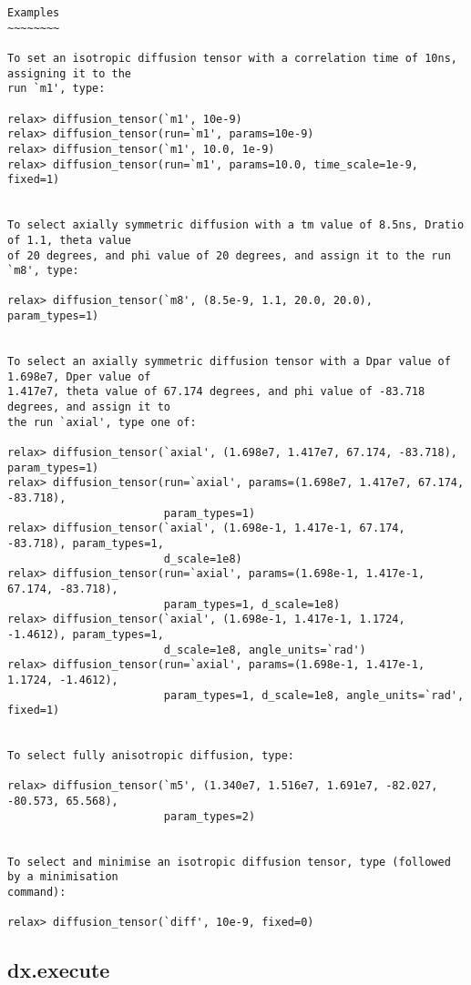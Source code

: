 {\begin{verbatim}
Examples
~~~~~~~~

To set an isotropic diffusion tensor with a correlation time of 10ns, assigning it to the
run `m1', type:

relax> diffusion_tensor(`m1', 10e-9)
relax> diffusion_tensor(run=`m1', params=10e-9)
relax> diffusion_tensor(`m1', 10.0, 1e-9)
relax> diffusion_tensor(run=`m1', params=10.0, time_scale=1e-9, fixed=1)


To select axially symmetric diffusion with a tm value of 8.5ns, Dratio of 1.1, theta value
of 20 degrees, and phi value of 20 degrees, and assign it to the run `m8', type:

relax> diffusion_tensor(`m8', (8.5e-9, 1.1, 20.0, 20.0), param_types=1)


To select an axially symmetric diffusion tensor with a Dpar value of 1.698e7, Dper value of
1.417e7, theta value of 67.174 degrees, and phi value of -83.718 degrees, and assign it to
the run `axial', type one of:

relax> diffusion_tensor(`axial', (1.698e7, 1.417e7, 67.174, -83.718), param_types=1)
relax> diffusion_tensor(run=`axial', params=(1.698e7, 1.417e7, 67.174, -83.718),
                        param_types=1)
relax> diffusion_tensor(`axial', (1.698e-1, 1.417e-1, 67.174, -83.718), param_types=1,
                        d_scale=1e8)
relax> diffusion_tensor(run=`axial', params=(1.698e-1, 1.417e-1, 67.174, -83.718),
                        param_types=1, d_scale=1e8)
relax> diffusion_tensor(`axial', (1.698e-1, 1.417e-1, 1.1724, -1.4612), param_types=1,
                        d_scale=1e8, angle_units=`rad')
relax> diffusion_tensor(run=`axial', params=(1.698e-1, 1.417e-1, 1.1724, -1.4612),
                        param_types=1, d_scale=1e8, angle_units=`rad', fixed=1)


To select fully anisotropic diffusion, type:

relax> diffusion_tensor(`m5', (1.340e7, 1.516e7, 1.691e7, -82.027, -80.573, 65.568),
                        param_types=2)


To select and minimise an isotropic diffusion tensor, type (followed by a minimisation
command):

relax> diffusion_tensor(`diff', 10e-9, fixed=0)
\end{verbatim}
}



\newpage

\subsection{dx.execute}


